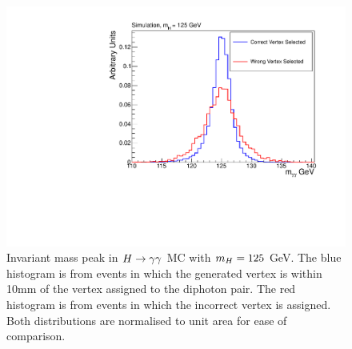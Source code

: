 \begin{figure}
\includegraphics[width=.8\textwidth]{hgg7TeV/generalPlots/rightwrongvtxpeak.pdf}
\caption{Invariant mass peak in $H\rightarrow\gamma\gamma$ MC with $m_{H}=125$ GeV. The blue histogram is from events in which 
the generated vertex is within 10mm of the vertex assigned to the diphoton pair. The red histogram is 
from events in which the incorrect vertex is assigned. Both distributions are normalised to unit area for
ease of comparison.}
\label{fig:higgsrightwrongvertex}
\end{figure} 

